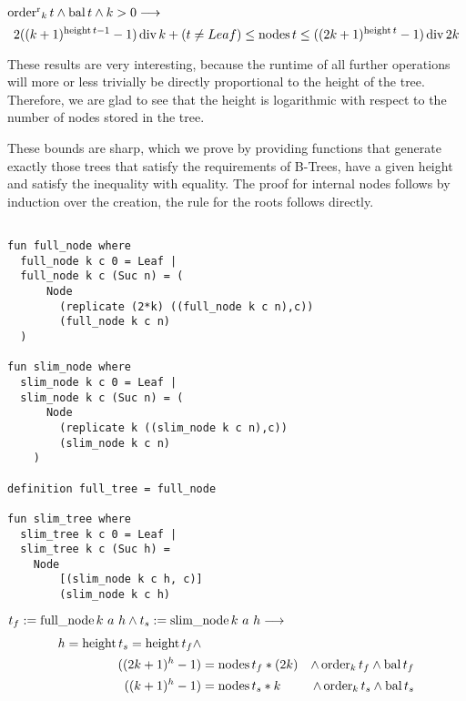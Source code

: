 \begin{theorem}
    $\operatorname{order^r}_k t \wedge \operatorname{bal} t \wedge k > 0 \longrightarrow$
    \begin{equation}
        2((k+1)^{\operatorname{height} t - 1} - 1) \operatorname{div} k + (t \neq Leaf) \le \operatorname{nodes} t \le ((2k+1)^{\operatorname{height} t} - 1) \operatorname{div} 2k
    \end{equation}
\end{theorem}

These results are very interesting, because
the runtime of all further operations will more or less trivially be
directly proportional to the height of the tree.
Therefore, we are glad to see that the height is logarithmic
with respect to the number of nodes stored in the tree.

These bounds are sharp, which we prove by providing 
functions that generate exactly those trees
that satisfy the requirements of B-Trees, have a given height
and satisfy the inequality with equality.
The proof for internal nodes follows by induction over the creation,
the rule for the roots follows directly.

\begin{lstlisting}[mathescape=true, language=Isabelle]

fun full_node where
  full_node k c 0 = Leaf |
  full_node k c (Suc n) = (
      Node
        (replicate (2*k) ((full_node k c n),c))
        (full_node k c n)
  )

fun slim_node where
  slim_node k c 0 = Leaf |
  slim_node k c (Suc n) = (
      Node
        (replicate k ((slim_node k c n),c))
        (slim_node k c n)
    )

definition full_tree = full_node

fun slim_tree where
  slim_tree k c 0 = Leaf |
  slim_tree k c (Suc h) =
    Node
        [(slim_node k c h, c)]
        (slim_node k c h)

\end{lstlisting}


\begin{lemma} $t_f := \operatorname{full\_node} k\ a\ h \wedge t_s := \operatorname{slim\_node} k\ a\ h \longrightarrow$
    \begin{align}
    h = \operatorname{height} t_s = \operatorname{height} t_f \wedge \\
    ((2k+1)^h - 1) &= \operatorname{nodes} t_f * (2k) &\wedge \operatorname{order}_k t_f \wedge \operatorname{bal} t_f \\ 
    ((k+1)^h - 1) &= \operatorname{nodes} t_s * k  &\wedge \operatorname{order}_k t_s \wedge \operatorname{bal} t_s
    \end{align}
\end{lemma}

